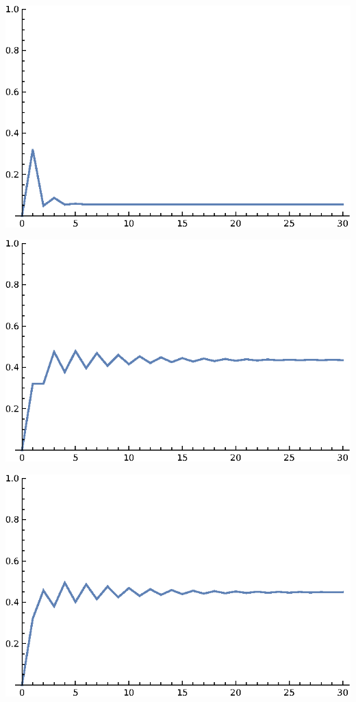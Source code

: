 \documentclass{article}
\begin{document}
\includegraphics{PageRank_gr2.eps}

\includegraphics{PageRank_gr3.eps}

\includegraphics{PageRank_gr4.eps}
\end{document}
